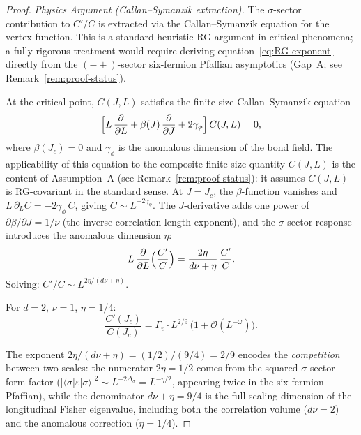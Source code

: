 \documentclass[11pt]{article}
\theoremstyle{definition}
\theoremstyle{remark}
\newcommand{\Jc}{J_c}
\newcommand{\cO}{\mathcal{O}}
\begin{document}
\begin{proof}
\medskip
\noindent\textit{Physics Argument (Callan--Symanzik extraction).}
The $\sigma$-sector contribution to $C'/C$ is extracted via the
Callan--Symanzik equation for the vertex function. This is a
standard heuristic RG argument in critical phenomena; a fully
rigorous treatment would require deriving equation~\eqref{eq:RG-exponent}
directly from the $(-+)$-sector six-fermion Pfaffian asymptotics
(Gap~A; see Remark~\ref{rem:proof-status}).

At the critical point, $C(J,L)$ satisfies the finite-size
Callan--Symanzik equation
\begin{equation}
  \Bigl[L\,\frac{\partial}{\partial L}
    + \beta(J)\,\frac{\partial}{\partial J}
    + 2\gamma_\phi\Bigr]\,C(J,L) = 0,
  \label{eq:callan-symanzik}
\end{equation}
where $\beta(\Jc) = 0$ and $\gamma_\phi$ is the anomalous
dimension of the bond field. The applicability of this equation to
the composite finite-size quantity $C(J,L)$ is the content of
Assumption~A (see Remark~\ref{rem:proof-status}): it assumes
$C(J,L)$ is RG-covariant in the standard sense.
At $J = \Jc$, the $\beta$-function vanishes and
$L\,\partial_L C = -2\gamma_\phi\,C$, giving
$C \sim L^{-2\gamma_\phi}$. The $J$-derivative adds
one power of $\partial\beta/\partial J = 1/\nu$ (the
inverse correlation-length exponent), and the $\sigma$-sector
response introduces the anomalous dimension $\eta$:
\begin{equation}
  L\,\frac{\partial}{\partial L}\Bigl(\frac{C'}{C}\Bigr)
    = \frac{2\eta}{d\nu + \eta}\,\frac{C'}{C}.
  \label{eq:RG-exponent}
\end{equation}
Solving: $C'/C \sim L^{2\eta/(d\nu+\eta)}$.

For $d = 2$, $\nu = 1$, $\eta = 1/4$:
\begin{equation}
  \boxed{
    \frac{C'(\Jc)}{C(\Jc)}
      = \Gamma_v \cdot L^{2/9}\,
        \bigl(1 + \cO(L^{-\omega})\bigr).
  }
  \label{eq:vertex-exponent}
\end{equation}

The exponent $2\eta/(d\nu + \eta) = (1/2)/(9/4) = 2/9$
encodes the \emph{competition} between two scales:
the numerator $2\eta = 1/2$ comes from the squared
$\sigma$-sector form factor
($|\langle\sigma|\varepsilon|\sigma\rangle|^2 \sim
L^{-2\Delta_\sigma} = L^{-\eta/2}$, appearing twice
in the six-fermion Pfaffian), while the denominator
$d\nu + \eta = 9/4$ is the full scaling dimension of
the longitudinal Fisher eigenvalue, including both the
correlation volume ($d\nu = 2$) and the anomalous
correction ($\eta = 1/4$).
\end{proof}
\end{document}
